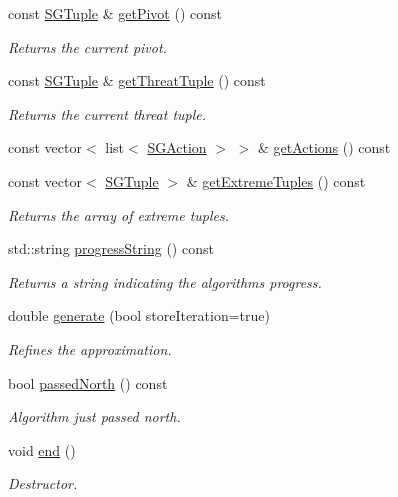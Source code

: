 \begin{DoxyCompactItemize}
const \hyperlink{classSGTuple}{S\+G\+Tuple} \& \hyperlink{classSGApprox_ae5b524bc10cf0178c23a95b3795231c7}{get\+Pivot} () const
\begin{DoxyCompactList}\small\item\em Returns the current pivot. \end{DoxyCompactList}\item 
\mbox{\label{classSGApprox_a74a2d231ba2d43002c616c8533b176d4}} 
const \hyperlink{classSGTuple}{S\+G\+Tuple} \& \hyperlink{classSGApprox_a74a2d231ba2d43002c616c8533b176d4}{get\+Threat\+Tuple} () const
\begin{DoxyCompactList}\small\item\em Returns the current threat tuple. \end{DoxyCompactList}\item 
const vector$<$ list$<$ \hyperlink{classSGAction}{S\+G\+Action} $>$ $>$ \& \hyperlink{classSGApprox_a067f58141855d9ef683c82a4d649ffd1}{get\+Actions} () const
\item 
\mbox{\label{classSGApprox_af46f4c8e34da4a86cffc1db52e5328bf}} 
const vector$<$ \hyperlink{classSGTuple}{S\+G\+Tuple} $>$ \& \hyperlink{classSGApprox_af46f4c8e34da4a86cffc1db52e5328bf}{get\+Extreme\+Tuples} () const
\begin{DoxyCompactList}\small\item\em Returns the array of extreme tuples. \end{DoxyCompactList}\item 
\mbox{\label{classSGApprox_ab41798c695da00bb2cc68edf67fb01a9}} 
std\+::string \hyperlink{classSGApprox_ab41798c695da00bb2cc68edf67fb01a9}{progress\+String} () const
\begin{DoxyCompactList}\small\item\em Returns a string indicating the algorithms progress. \end{DoxyCompactList}\item 
double \hyperlink{classSGApprox_a9cf7330f7cab3f454b0850e778d132fa}{generate} (bool store\+Iteration=true)
\begin{DoxyCompactList}\small\item\em Refines the approximation. \end{DoxyCompactList}\item 
bool \hyperlink{classSGApprox_aa2ecb39d9938587e67bb07b9b445d6d4}{passed\+North} () const
\begin{DoxyCompactList}\small\item\em Algorithm just passed north. \end{DoxyCompactList}\item 
void \hyperlink{classSGApprox_af4ec568399b6e3ae16e6087d02381c12}{end} ()
\begin{DoxyCompactList}\small\item\em Destructor. \end{DoxyCompactList}\end{DoxyCompactItemize}
